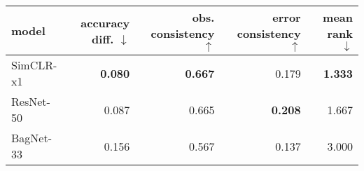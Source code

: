 \begin{tabular}{lrrrr}
\toprule
    model & accuracy diff. $\downarrow$ & obs. consistency $\uparrow$ & error consistency $\uparrow$ & mean rank $\downarrow$ \\
\midrule
SimCLR-x1 &              \textbf{0.080} &              \textbf{0.667} &                        0.179 &         \textbf{1.333} \\
ResNet-50 &                       0.087 &                       0.665 &               \textbf{0.208} &                  1.667 \\
BagNet-33 &                       0.156 &                       0.567 &                        0.137 &                  3.000 \\
\bottomrule
\end{tabular}

